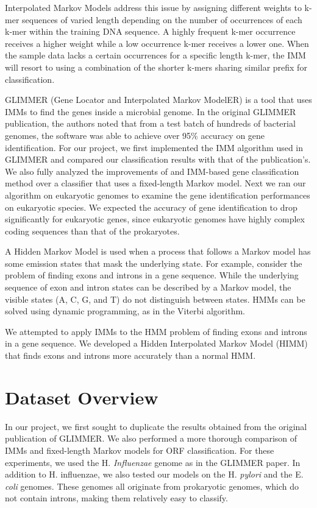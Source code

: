 \documentclass[11pt,letterpaper]{article}
\begin{document}
Interpolated Markov Models address this issue by assigning different weights to k-mer sequences of varied length depending on the number of occurrences of each k-mer within the training DNA sequence. A highly frequent k-mer occurrence receives a higher weight while a low occurrence k-mer receives a lower one. When the sample data lacks a certain occurrences for a specific length k-mer, the IMM will resort to using a combination of the shorter k-mers sharing similar prefix for classification.

GLIMMER (Gene Locator and Interpolated Markov ModelER) is a tool that uses IMMs to find the genes inside a microbial genome. In the original GLIMMER publication, the authors noted that from a test batch of hundreds of bacterial genomes, the software was able to achieve over 95\% accuracy on gene identification. For our project, we first implemented the IMM algorithm used in GLIMMER and compared our classification results with that of the publication's. We also fully analyzed the improvements of and IMM-based gene classification method over a classifier that uses a fixed-length Markov model. Next we ran our algorithm on eukaryotic genomes to examine the gene identification performances on eukaryotic species. We expected the accuracy of gene identification to drop significantly for eukaryotic genes, since eukaryotic genomes have highly complex coding sequences than that of the prokaryotes.

A Hidden Markov Model is used when a process that follows a Markov model has some emission states that mask the underlying state. For example, consider the problem of finding exons and introns in a gene sequence. While the underlying sequence of exon and intron states can be described by a Markov model, the visible states (A, C, G, and T) do not distinguish between states. HMMs can be solved using dynamic programming, as in the Viterbi algorithm.

We attempted to apply IMMs to the HMM problem of finding exons and introns in a gene sequence. We developed a Hidden Interpolated Markov Model (HIMM) that finds exons and introns more accurately than a normal HMM.


\section{Dataset Overview}

In our project, we first sought to duplicate the results obtained from the original publication of GLIMMER. We also performed a more thorough comparison of IMMs and fixed-length Markov models for ORF classification. For these experiments, we used the H. \emph{Influenzae} genome as in the GLIMMER paper. In addition to H. influenzae, we also tested our models on the H. \emph{pylori} and the E. \emph{coli} genomes. These genomes all originate from prokaryotic genomes, which do not contain introns, making them relatively easy to classify.
\end{document}
